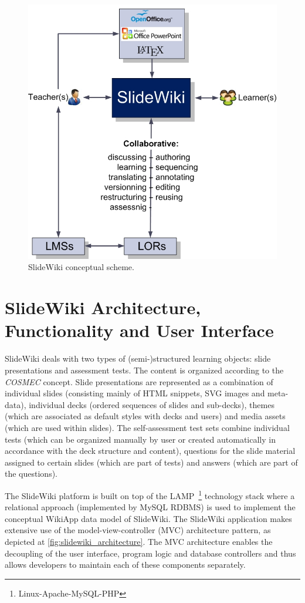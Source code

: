 \documentclass[ngerman,UKenglish,table]{scrbook}
\begin{document}
\begin{figure}[tb]
\centering
	\includegraphics[width=0.6\columnwidth]{images/conceptual_scheme.jpg}
	\caption{SlideWiki conceptual scheme.}
	\label{fig:slidewiki_scheme}
\end{figure}

\section{SlideWiki Architecture, Functionality and User Interface}
\label{sec:architecture}

SlideWiki deals with two types of (semi-)structured learning objects: slide presentations and assessment tests.
The content is organized according to the \emph{COSMEC} concept.
Slide presentations are represented as a combination of individual slides (consisting mainly of HTML snippets, SVG images and meta-data), individual decks (ordered sequences of slides and sub-decks), themes (which are associated as default styles with decks and users) and media assets (which are used within slides).
The self-assessment test sets combine individual tests (which can be organized manually by user or created automatically in accordance with the deck structure and content), questions for the slide material assigned to certain slides (which are part of tests) and answers (which are part of the questions).

The SlideWiki platform is built on top of the LAMP~\footnote{Linux-Apache-MySQL-PHP} technology stack where a relational approach (implemented by MySQL RDBMS) is used to implement the conceptual WikiApp data model of SlideWiki.
The SlideWiki application makes extensive use of the model-view-controller (MVC) architecture pattern, as depicted at \autoref{fig:slidewiki_architecture}.
The MVC architecture enables the decoupling of the user interface, program logic and database controllers and thus allows developers to maintain each of these components separately.
\end{document}
